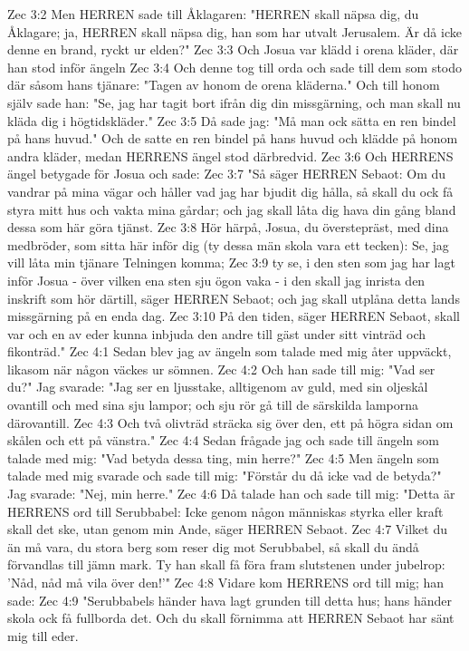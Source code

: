Zec 3:2  Men HERREN sade till Åklagaren: "HERREN skall näpsa dig, du Åklagare; ja, HERREN skall näpsa dig, han som har utvalt Jerusalem. Är då icke denne en brand, ryckt ur elden?"
Zec 3:3  Och Josua var klädd i orena kläder, där han stod inför ängeln
Zec 3:4  Och denne tog till orda och sade till dem som stodo där såsom hans tjänare: "Tagen av honom de orena kläderna." Och till honom själv sade han: "Se, jag har tagit bort ifrån dig din missgärning, och man skall nu kläda dig i högtidskläder."
Zec 3:5  Då sade jag: "Må man ock sätta en ren bindel på hans huvud." Och de satte en ren bindel på hans huvud och klädde på honom andra kläder, medan HERRENS ängel stod därbredvid.
Zec 3:6  Och HERRENS ängel betygade för Josua och sade:
Zec 3:7  "Så säger HERREN Sebaot: Om du vandrar på mina vägar och håller vad jag har bjudit dig hålla, så skall du ock få styra mitt hus och vakta mina gårdar; och jag skall låta dig hava din gång bland dessa som här göra tjänst.
Zec 3:8  Hör härpå, Josua, du överstepräst, med dina medbröder, som sitta här inför dig (ty dessa män skola vara ett tecken): Se, jag vill låta min tjänare Telningen komma;
Zec 3:9  ty se, i den sten som jag har lagt inför Josua - över vilken ena sten sju ögon vaka - i den skall jag inrista den inskrift som hör därtill, säger HERREN Sebaot; och jag skall utplåna detta lands missgärning på en enda dag.
Zec 3:10  På den tiden, säger HERREN Sebaot, skall var och en av eder kunna inbjuda den andre till gäst under sitt vinträd och fikonträd."
Zec 4:1  Sedan blev jag av ängeln som talade med mig åter uppväckt, likasom när någon väckes ur sömnen.
Zec 4:2  Och han sade till mig: "Vad ser du?" Jag svarade: "Jag ser en ljusstake, alltigenom av guld, med sin oljeskål ovantill och med sina sju lampor; och sju rör gå till de särskilda lamporna därovantill.
Zec 4:3  Och två olivträd sträcka sig över den, ett på högra sidan om skålen och ett på vänstra."
Zec 4:4  Sedan frågade jag och sade till ängeln som talade med mig: "Vad betyda dessa ting, min herre?"
Zec 4:5  Men ängeln som talade med mig svarade och sade till mig: "Förstår du då icke vad de betyda?" Jag svarade: "Nej, min herre."
Zec 4:6  Då talade han och sade till mig: "Detta är HERRENS ord till Serubbabel: Icke genom någon människas styrka eller kraft skall det ske, utan genom min Ande, säger HERREN Sebaot.
Zec 4:7  Vilket du än må vara, du stora berg som reser dig mot Serubbabel, så skall du ändå förvandlas till jämn mark. Ty han skall få föra fram slutstenen under jubelrop: 'Nåd, nåd må vila över den!'"
Zec 4:8  Vidare kom HERRENS ord till mig; han sade:
Zec 4:9  "Serubbabels händer hava lagt grunden till detta hus; hans händer skola ock få fullborda det. Och du skall förnimma att HERREN Sebaot har sänt mig till eder.
